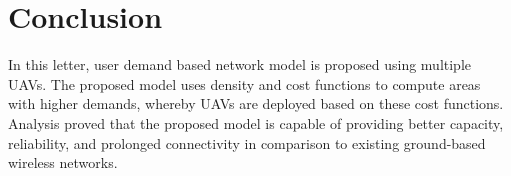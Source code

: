 \documentclass[journal]{IEEEtran}
\begin{document}
\section{Conclusion}
In this letter, user demand based network model is proposed using multiple UAVs. The proposed model uses density and cost functions to compute areas with higher demands, whereby UAVs are deployed based on these cost functions. Analysis proved that the proposed model is capable of providing better capacity, reliability, and prolonged connectivity in comparison to existing ground-based wireless networks.

\nocite{*}

\end{document}
